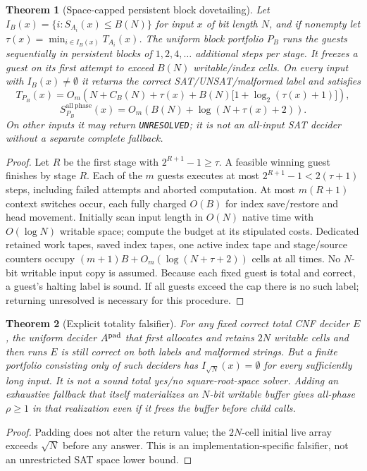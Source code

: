 \documentclass[11pt]{article}
\newtheorem{theorem}{Theorem}
\begin{document}
\begin{theorem}[Space-capped persistent block dovetailing]
Let $I_B(x)=\{i:S_{A_i}(x)\le B(N)\}$ for input $x$ of bit length $N$, and if nonempty let $\tau(x)=\min_{i\in I_B(x)}T_{A_i}(x)$. The uniform block portfolio $P_B$ runs the guests sequentially in persistent blocks of $1,2,4,\ldots$ additional steps per stage. It freezes a guest on its first attempt to exceed $B(N)$ writable/index cells. On every input with $I_B(x)\ne\emptyset$ it returns the correct SAT/UNSAT/malformed label and satisfies
\[
T_{P_B}(x)=O_m\!\left(N+C_B(N)+\tau(x)+B(N)\bigl[1+\log_2(\tau(x)+1)\bigr]\right),
\]
\[
S^{\mathrm{all\ phase}}_{P_B}(x)
=O_m\!\left(B(N)+\log(N+\tau(x)+2)\right).
\]
On other inputs it may return \texttt{UNRESOLVED}; it is not an all-input SAT decider without a separate complete fallback.
\end{theorem}
\begin{proof}
Let $R$ be the first stage with $2^{R+1}-1\ge\tau$. A feasible winning guest finishes by stage $R$. Each of the $m$ guests executes at most $2^{R+1}-1<2(\tau+1)$ steps, including failed attempts and aborted computation. At most $m(R+1)$ context switches occur, each fully charged $O(B)$ for index save/restore and head movement. Initially scan input length in $O(N)$ native time with $O(\log N)$ writable space; compute the budget at its stipulated costs. Dedicated retained work tapes, saved index tapes, one active index tape and stage/source counters occupy $(m+1)B+O_m(\log(N+\tau+2))$ cells at all times. No $N$-bit writable input copy is assumed. Because each fixed guest is total and correct, a guest's halting label is sound. If all guests exceed the cap there is no such label; returning unresolved is necessary for this procedure.
\end{proof}

\begin{theorem}[Explicit totality falsifier]
For any fixed correct total CNF decider $E$, the uniform decider $A^{\rm pad}$ that first allocates and retains $2N$ writable cells and then runs $E$ is still correct on both labels and malformed strings. But a finite portfolio consisting only of such deciders has $I_{\sqrt N}(x)=\emptyset$ for every sufficiently long input. It is not a sound total yes/no square-root-space solver. Adding an exhaustive fallback that itself materializes an $N$-bit writable buffer gives all-phase $\rho\ge1$ in that realization even if it frees the buffer before child calls.
\end{theorem}
\begin{proof}Padding does not alter the return value; the $2N$-cell initial live array exceeds $\sqrt N$ before any answer. This is an implementation-specific falsifier, not an unrestricted SAT space lower bound.\end{proof}
\end{document}
